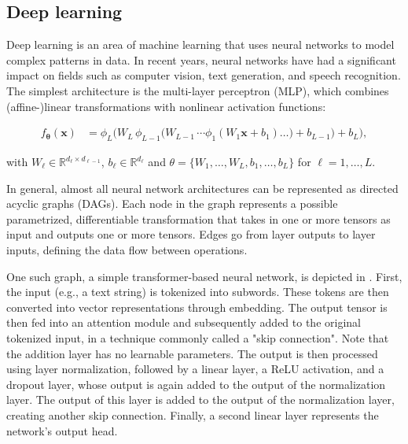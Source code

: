 \documentclass[article]{jss}
\theoremstyle{definition}
\begin{document}
\subsection{Deep learning}\label{sec:background_dl}

Deep learning is an area of machine learning that uses neural networks to model complex patterns in data.
In recent years, neural networks have had a significant impact on fields such as computer vision, text generation, and speech recognition.
The simplest architecture is the multi-layer perceptron (MLP), which combines (affine-)linear transformations with nonlinear activation functions:

\begin{align}
f_{\boldsymbol{\theta}}(\mathbf{x}) &=
  \phi_{L}\!\bigl(
    W_{L}\,\phi_{L-1}\!\bigl(
      W_{L-1}\,\dotsm\phi_{1}(W_{1}\mathbf{x}+b_{1}) \ldots )+ b_{L - 1}
    \bigr)+b_{L}
  \bigr),
\end{align}

\noindent
with \(W_{\ell}\in\mathbb{R}^{d_{\ell}\times d_{\ell-1}}\), \(b_{\ell}\in\mathbb{R}^{d_{\ell}}\) and \(\theta = \{W_1, \ldots, W_L, b_1, \ldots, b_L\}\) for \(\ell=1,\dots,L\).

In general, almost all neural network architectures can be represented as directed acyclic graphs (DAGs).
Each node in the graph represents a possible parametrized, differentiable transformation that takes in one or more tensors as input and outputs one or more tensors.
Edges go from layer outputs to layer inputs, defining the data flow between operations.

One such graph, a simple transformer-based neural network, is depicted in .
First, the input (e.g., a text string) is tokenized into subwords. These tokens are then converted into vector representations through embedding.
The output tensor is then fed into an attention module and subsequently added to the original tokenized input, in a technique commonly called a "skip connection".
Note that the addition layer has no learnable parameters.
The output is then processed using layer normalization, followed by a linear layer, a ReLU activation, and a dropout layer, whose output is again added to the output of the normalization layer.
The output of this layer is added to the output of the normalization layer, creating another skip connection.
Finally, a second linear layer represents the network's output head.
\end{document}
